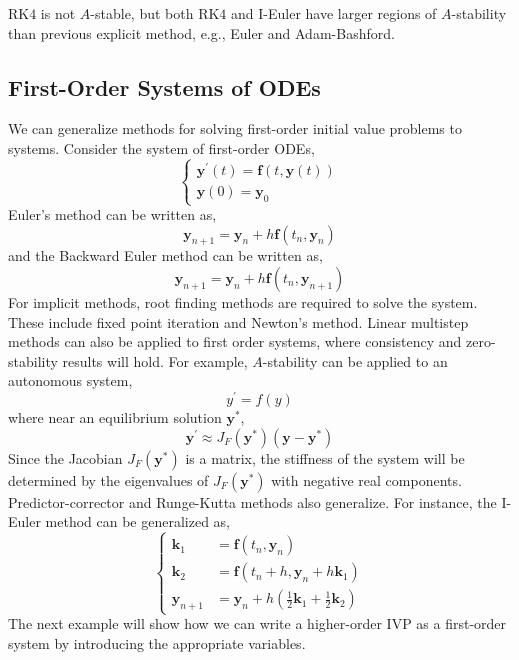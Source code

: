 \begin{marginfigure}
	RK$4$ is not $A$-stable, but both RK$4$ and I-Euler have larger regions of $A$-stability than previous explicit method, e.g., Euler and Adam-Bashford.
\end{marginfigure}

\subsection{First-Order Systems of ODEs}
We can generalize methods for solving first-order initial value problems to systems. Consider the system of first-order ODEs,
\[\left\{\begin{array}{l}
\mathbf{y}^{\prime}(t)=\mathbf{f}(t, \mathbf{y}(t)) \\
\mathbf{y}(0)=\mathbf{y}_0
\end{array}\right.\]
Euler's method can be written as,
\[\mathbf{y}_{n+1}=\mathbf{y}_n+h \mathbf{f}\left(t_n, \mathbf{y}_n\right)\]
and the Backward Euler method can be written as,
\[\mathbf{y}_{n+1}=\mathbf{y}_n+h \mathbf{f}\left(t_n, \mathbf{y}_{n+1}\right)\]
For implicit methods, root finding methods are required to solve the system. These include fixed point iteration and Newton's method. Linear multistep methods can also be applied to first order systems, where consistency and zero-stability results will hold. For example, $A$-stability can be applied to an autonomous system,
\[y^{\prime}=f(y)\]
where near an equilibrium solution $\mathbf{y}^*$,
\[\mathbf{y}^{\prime} \approx J_F\left(\mathbf{y}^*\right)\left(\mathbf{y}-\mathbf{y}^*\right)\]
Since the Jacobian $J_F\left(\mathbf{y}^*\right)$ is a matrix, the stiffness of the system will be determined by the eigenvalues of $J_F\left(\mathbf{y}^*\right)$ with negative real components. Predictor-corrector and Runge-Kutta methods also generalize. For instance, the I-Euler method can be generalized as,
\[\left\{\begin{aligned}
\mathbf{k}_1 &=\mathbf{f}\left(t_n, \mathbf{y}_n\right) \\
\mathbf{k}_2 &=\mathbf{f}\left(t_n+h, \mathbf{y}_n+h \mathbf{k}_1\right) \\
\mathbf{y}_{n+1} &=\mathbf{y}_n+h\left(\frac{1}{2} \mathbf{k}_1+\frac{1}{2} \mathbf{k}_2\right)
\end{aligned}\right.\]
The next example will show how we can write a higher-order IVP as a first-order system by introducing the appropriate variables.

\NewLine 

